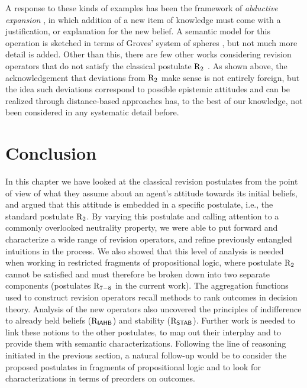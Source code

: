 A response to these kinds of examples has been the framework of \emph{abductive expansion}
\cite{Pagnucco94}, in which addition of a new item of knowledge must come with a 
justification, or explanation for the new belief.
A semantic model for this operation is sketched in terms of Groves' system of spheres \cite{Grove88},
but not much more detail is added.
Other than this, there are few other works considering revision operators 
that do not satisfy the classical postulate $\mathrm{R}_{2}$ \cite{Ryan96,BenferhatLP05}.
As shown above, the acknowledgement that 
deviations from $\mathrm{R}_{2}$ make sense is not entirely foreign,
but the idea such deviations correspond to possible 
epistemic attitudes and can be realized through distance-based
approaches has, to the best of our knowledge, 
not been considered in any systematic detail before.


















\section{Conclusion}
In this chapter we have looked at the classical  revision postulates
from the point of view of what they assume about an agent's 
attitude towards its initial beliefs,
and argued that this attitude is embedded in a specific postulate,
i.e., the standard postulate $\mathrm{R}_{2}$.
By varying this postulate
and calling attention to a commonly overlooked neutrality property,
we were able to put forward and 
characterize a wide range of revision operators,
and refine previously entangled intuitions in the process.
We also showed that this level of analysis is needed when working
in restricted fragments of propositional logic,
where postulate $\mathrm{R}_{2}$ cannot be satisfied and must therefore
be broken down into two separate components (postulates $\mathrm{R}_{7-8}$ in the current work).
The aggregation functions used to construct revision operators
recall methods to rank outcomes in decision theory. 
Analysis of the new operators also 
uncovered the principles of indifference to already held beliefs ($\mathrm{R}_{\mathsf{IAHB}}$) and
stability ($\mathrm{R}_{\mathsf{STAB}}$). Further work is needed to link these notions to the other 
postulates, to map out their interplay 
and to provide them with semantic characterizations.
Following the line of reasoning initiated in the previous section,
a natural follow-up would be to consider the proposed
postulates in fragments of propositional logic 
and to look for characterizations in terms of 
preorders on outcomes.

